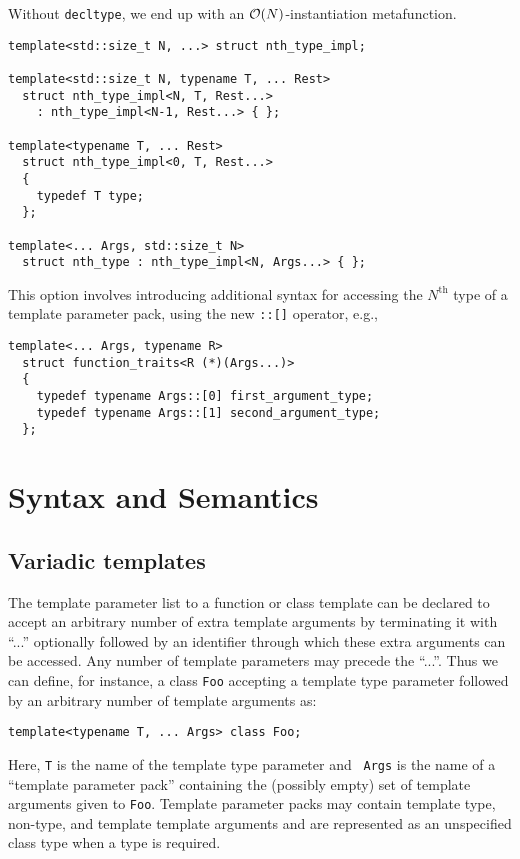 \documentclass{article}
\begin{document}
Without \texttt{decltype}, we end up with an ${\cal
O}(N)$-instantiation metafunction.

\begin{verbatim}
template<std::size_t N, ...> struct nth_type_impl;

template<std::size_t N, typename T, ... Rest>
  struct nth_type_impl<N, T, Rest...>
    : nth_type_impl<N-1, Rest...> { };

template<typename T, ... Rest>
  struct nth_type_impl<0, T, Rest...>
  {
    typedef T type;
  };
  
template<... Args, std::size_t N>
  struct nth_type : nth_type_impl<N, Args...> { };
\end{verbatim}

This option involves introducing additional syntax for accessing the
$N^{\text{th}}$ type of a template parameter pack, using the new
\texttt{::[]} operator, e.g.,

\begin{verbatim}
template<... Args, typename R>
  struct function_traits<R (*)(Args...)>
  {
    typedef typename Args::[0] first_argument_type;
    typedef typename Args::[1] second_argument_type;
  };
\end{verbatim}

\section{Syntax and Semantics}
\subsection{Variadic templates}
\par The template parameter list to a function or class template can
be declared to accept an arbitrary number of extra template arguments
by terminating it with ``...'' optionally followed by an identifier
through which these extra arguments can be accessed.
Any number of template
parameters may precede the ``...''. Thus we can define, for instance,
a class {\tt Foo} accepting a template type parameter followed by an
arbitrary number of template arguments as:
\begin{verbatim}
template<typename T, ... Args> class Foo;
\end{verbatim}

\noindent
Here, {\tt T} is the name of the template type parameter and {\tt
  Args} is the name of a ``template parameter pack'' containing the
(possibly empty) set of template arguments given to {\tt Foo}.
Template parameter packs may contain template type, non-type, and
template template arguments and are represented as an unspecified
class type when a type is required.
\end{document}
